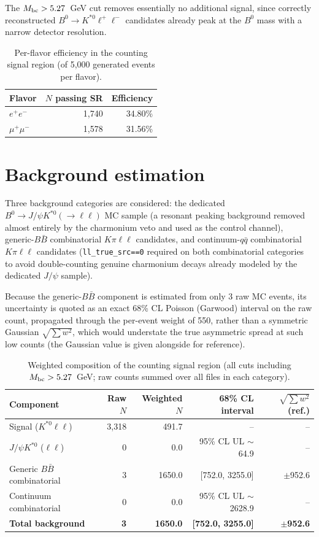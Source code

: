 \documentclass[11pt]{article}
\begin{document}
The $M_{\rm bc}>5.27$~GeV cut removes essentially no additional signal,
since correctly reconstructed $B^0\to K^{*0}\ell^+\ell^-$ candidates
already peak at the $B^0$ mass with a narrow detector resolution.

\begin{table}[H]
\centering
\caption{Per-flavor efficiency in the counting signal region (of 5,000 generated events per flavor).}
\begin{tabular}{lrr}
\toprule
Flavor & $N$ passing SR & Efficiency \\
\midrule
$e^+e^-$ & 1,740 & 34.80\% \\
$\mu^+\mu^-$ & 1,578 & 31.56\% \\
\bottomrule
\end{tabular}
\end{table}

\section{Background estimation}
\label{sec:bkg}

Three background categories are considered: the dedicated
$B^0\to J/\psi K^{*0}(\to\ell\ell)$ MC sample (a resonant peaking
background removed almost entirely by the charmonium veto and used as
the control channel), generic-$B\bar B$ combinatorial $K\pi\ell\ell$
candidates, and continuum-$q\bar q$ combinatorial $K\pi\ell\ell$
candidates (\texttt{ll\_true\_src==0} required on both combinatorial
categories to avoid double-counting genuine charmonium decays already
modeled by the dedicated $J/\psi$ sample).

Because the generic-$B\bar B$ component is estimated from only 3 raw MC
events, its uncertainty is quoted as an exact 68\% CL Poisson (Garwood)
interval on the raw count, propagated through the per-event weight of
550, rather than a symmetric Gaussian $\sqrt{\sum w^2}$, which would
understate the true asymmetric spread at such low counts (the Gaussian
value is given alongside for reference).

\begin{table}[H]
\centering
\caption{Weighted composition of the counting signal region (all cuts including $M_{\rm bc}>5.27$~GeV; raw counts summed over all files in each category).}
\begin{tabular}{lrrrr}
\toprule
Component & Raw $N$ & Weighted $N$ & 68\% CL interval & $\sqrt{\sum w^2}$ (ref.) \\
\midrule
Signal ($K^{*0}\ell\ell$) & 3,318 & 491.7 & -- & -- \\
$J/\psi K^{*0}$ ($\ell\ell$) & 0 & 0.0 & 95\% CL UL $\sim$64.9 & -- \\
Generic $B\bar B$ combinatorial & 3 & 1650.0 & [752.0, 3255.0] & $\pm$952.6 \\
Continuum combinatorial & 0 & 0.0 & 95\% CL UL $\sim$2628.9 & -- \\
\midrule
\textbf{Total background} & \textbf{3} & \textbf{1650.0} & \textbf{[752.0, 3255.0]} & \textbf{$\pm$952.6} \\
\bottomrule
\end{tabular}
\end{table}
\end{document}
